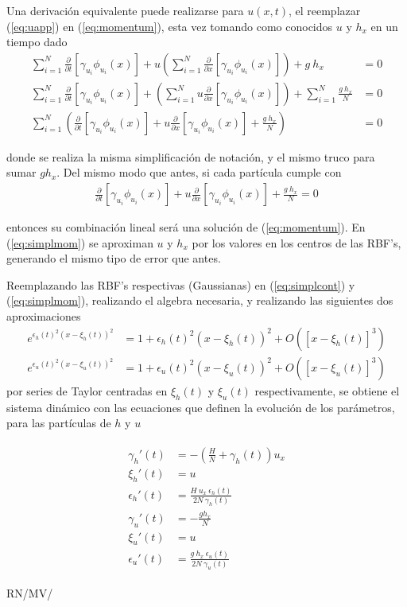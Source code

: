 \documentclass[spanish]{article}
\begin{document}
 	 Una derivación equivalente puede realizarse para $u(x,t)$, el reemplazar (\ref{eq:uapp}) en (\ref{eq:momentum}), esta vez tomando como conocidos $u$ y $h_x$ en un tiempo dado
 	 \begin{align*}
 	 \sum_{i=1}^{N} \frac{\partial}{\partial t}[\gamma_{u_i}\phi_{u_i}(x)] + u  \left(\sum_{i=1}^{N}\frac{\partial}{\partial x} [\gamma_{u_i} \phi_{u_i}(x)]\right) + g \ h_x & = 0 \\
 	 \sum_{i=1}^{N} \frac{\partial}{\partial t}[\gamma_{u_i}\phi_{u_i}(x)] + \left(\sum_{i=1}^{N}u \frac{\partial}{\partial x} [\gamma_{u_i} \phi_{u_i}(x)]\right) + \sum_{i=1}^N \frac{g \ h_x}{N} & = 0 \\
 	 \sum_{i=1}^{N}\left( \frac{\partial}{\partial t}[\gamma_{u_i}\phi_{u_i}(x)] + u \frac{\partial}{\partial x} [\gamma_{u_i} \phi_{u_i}(x)] + \frac{g \ h_x}{N} \right) & = 0
 	 \end{align*}

 	 \noindent donde se realiza la misma simplificación de notación, y el mismo truco para sumar $g h_x$. Del mismo modo que antes, si cada partícula cumple con  
 	 \begin{align}
 	 	\frac{\partial}{\partial t}[\gamma_{u_i}\phi_{u_i}(x)] + u \frac{\partial}{\partial x} [\gamma_{u_i} \phi_{u_i}(x)] + \frac{g \ h_x}{N} = 0
 	 	\label{eq:simplmom}
 	 \end{align}

 	 \noindent entonces su combinación lineal será una solución de  (\ref{eq:momentum}). En (\ref{eq:simplmom}) se aproximan $u$ y $h_x$ por los valores en los centros de las RBF's, generando el mismo tipo de error que antes.


 	 Reemplazando las RBF's respectivas (Gaussianas) en (\ref{eq:simplcont}) y (\ref{eq:simplmom}), realizando el algebra necesaria, y realizando las siguientes dos aproximaciones
 	 \begin{align*}
 	 	e^{\epsilon_h(t)^2 (x-\xi_h(t))^2} & = 1 + \epsilon_h(t)^2 (x-\xi_h(t))^2 + O([x-\xi_h(t)]^3) \\
 	 	e^{\epsilon_u(t)^2 (x-\xi_u(t))^2} & = 1 + \epsilon_u(t)^2 (x-\xi_u(t))^2 + O([x-\xi_u(t)]^3) 
 	 \end{align*}
 	 por series de Taylor centradas en $\xi_h(t)$ y $\xi_u(t)$ respectivamente, se obtiene el sistema dinámico con las ecuaciones que definen la evolución de los parámetros, para las partículas de $h$ y $u$

 	\begin{align}
 	\begin{split}
	\gamma _h'(t) &= -\left(\frac{H}{N} + \gamma _h(t)\right)u_x  \\
	\xi _h'(t) &= u \\
	\epsilon _h'(t) &= \frac{H \ u_x \ \epsilon_h(t)}{2 N \ \gamma_h(t)} \\
	\gamma _u'(t) &= -\frac{g h_x}{N} \\
	\xi _u'(t) &= u \\
	\epsilon _u'(t) &= \frac{g \ h_x \ \epsilon _u(t)}{2 N \ \gamma_u(t)}
	\end{split}
	\end{align} 



\newpage

 

\vfill\hfill RN/MV/\LaTeXe
\end{document}
